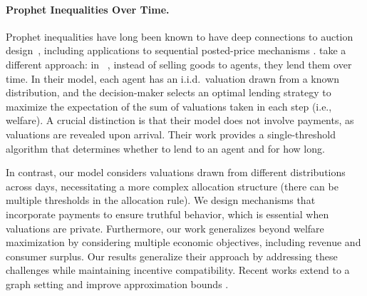 \documentclass[11pt,letterpaper]{article}
\theoremstyle{plain}
\begin{document}
\paragraph{Prophet Inequalities Over Time.}
Prophet inequalities have long been known to have deep connections to auction design~\cite{HajiaghayiKS07}, including applications to sequential posted-price mechanisms \cite{KleinbergW12}.
\cite{AbelsPS23} take a different approach: in ~\cite{AbelsPS23}, 
instead of selling goods to agents, they lend them over time.  In their model, each agent has an i.i.d.~valuation drawn from a known distribution, and the decision-maker selects an optimal lending strategy to maximize the expectation of the sum of valuations taken in each step (i.e., welfare). A crucial distinction is that their model does not involve payments, as valuations are revealed upon arrival. Their work provides a single-threshold algorithm that determines whether to lend to an agent and for how long.

In contrast, our model considers valuations drawn from different distributions across days, necessitating a more complex allocation structure (there can be multiple thresholds in the allocation rule). We design mechanisms that incorporate payments to ensure truthful behavior, which is essential when valuations are private. Furthermore, our work generalizes beyond welfare maximization by considering multiple economic objectives, including revenue and consumer surplus. Our results generalize their approach by addressing these challenges while maintaining incentive compatibility. 
 Recent works extend \cite{AbelsPS23} to a graph setting \cite{CristiO24} and improve approximation bounds \cite{perezsalazar2024}.
 
\end{document}
